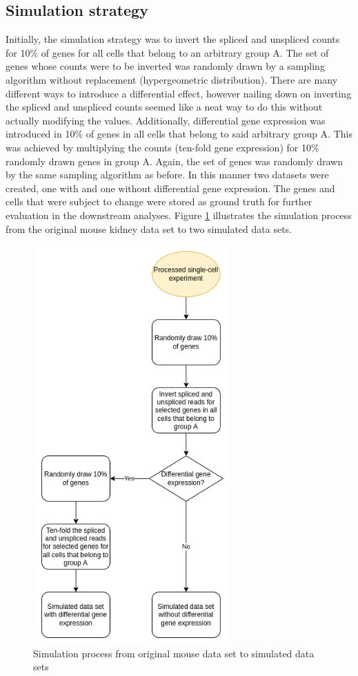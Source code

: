 \subsection{Simulation strategy}
Initially, the simulation strategy was to invert the spliced and unspliced counts for 10\% of genes for all cells that belong to an arbitrary group A. The set of genes whose counts were to be inverted was randomly drawn by a sampling algorithm without replacement (hypergeometric distribution). There are many different ways to introduce a differential effect, however nailing down on inverting the spliced and unspliced counts seemed like a neat way to do this without actually modifying the values. Additionally, differential gene expression was introduced in 10\% of genes in all cells that belong to said arbitrary group A. This was achieved by multiplying the counts (ten-fold gene expression) for 10\% randomly drawn genes in group A. Again, the set of genes was randomly drawn by the same sampling algorithm as before. In this manner two datasets were created, one with and one without differential gene expression. The genes and cells that were subject to change were stored as ground truth for further evaluation in the downstream analyses. Figure \ref{fig:simulation_process} illustrates the simulation process from the original mouse kidney data set to two simulated data sets.

\begin{figure}[!htb]
\begin{center}
\includegraphics[width=3in,height=6in]{figure/kidney_mouse/first_simulation_process.png}
\end{center}
\caption{Simulation process from original mouse data set to simulated data sets}
\label{fig:simulation_process}
\end{figure}
\FloatBarrier

